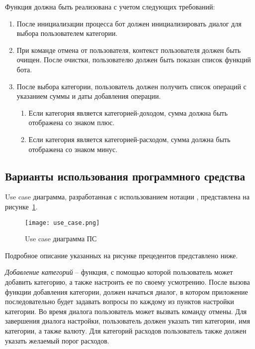 Функция должна быть реализована с учетом следующих требований:

\begin{enumerate}
	\item После инициализации процесса бот должен инициализировать диалог для выбора пользователем категории.
	\item При команде отмена от пользователя, контекст пользователя должен быть очищен. После очистки, пользователю должен быть показан список функций бота.
	\item После выбора категории, пользователь должен получить список операций с указанием суммы и даты добавления операции.
	\begin{enumerate}
		\item Если категория является категорией-доходом, сумма должна быть отображена со знаком плюс.
		\item Если категория является категорией-расходом, сумма должна быть отображена со знаком минус.
	\end{enumerate}
\end{enumerate}

\subsection{Варианты использования программного средства} 
\label{sec:domain:model:use_cases}

Use case диаграмма, разработанная с использованием нотации \linebreak \uml, представлена на рисунке~\ref{fig:domain:model:use_cases:model}.

\begin{figure}[!h]
\centering
	\texttt{[image: use\_case.png]}
	\caption{Use case диаграмма ПС}
	\label{fig:domain:model:use_cases:model}
\end{figure}

Подробное описание указанных на рисунке прецедентов представлено ниже.

\emph{Добавление категорий} -- функция, с помощью которой пользователь может добавить категорию, а также настроить ее по своему усмотрению. После вызова функции добавления категории, должен начаться диалог, в котором приложение последовательно будет задавать вопросы по каждому из пунктов настройки категории. Во время диалога пользователь может вызвать команду отмены. Для завершения диалога настройки, пользователь должен указать тип категории, имя категории, а также валюту. Для категорий расходов пользователь также должен указать желаемый порог расходов.


